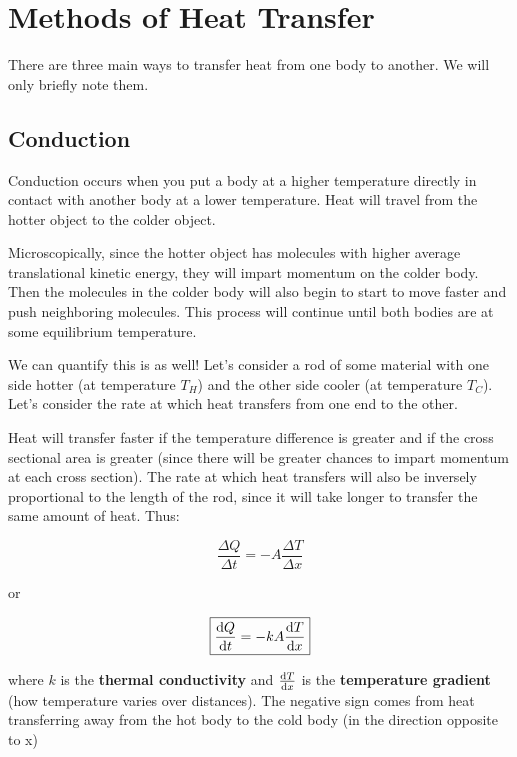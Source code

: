 \documentclass{report}
\begin{document}
\section{Methods of Heat Transfer}
There are three main ways to transfer heat from one body to another. We will only briefly note them.

\subsection{Conduction}

Conduction occurs when you put a body at a higher temperature directly in contact with another body at a lower temperature. Heat will travel from the hotter object to the colder object.

Microscopically, since the hotter object has molecules with higher average translational kinetic energy, they will impart momentum on the colder body. Then the molecules in the colder body will also begin to start to move faster and push neighboring molecules. This process will continue until both bodies are at some equilibrium temperature.

We can quantify this is as well! Let's consider a rod of some material with one side hotter (at temperature $T_H$) and the other side cooler (at temperature $T_C$). Let's consider the rate at which heat transfers from one end to the other.

Heat will transfer faster if the temperature difference is greater and if the cross sectional area is greater (since there will be greater chances to impart momentum at each cross section). The rate at which heat transfers will also be inversely proportional to the length of the rod, since it will take longer to transfer the same amount of heat. Thus:

$$\frac{\Delta Q}{\Delta t} = -A\frac{\Delta T}{\Delta x}$$

or


$$\boxed{\dv{Q}{t} = -kA\dv{T}{x}}$$

where $k$ is the \textbf{thermal conductivity} and $\dv{T}{x}$ is the \textbf{temperature gradient} (how temperature varies over distances). The negative sign comes from heat transferring away from the hot body to the cold body (in the direction opposite to x)
\end{document}
